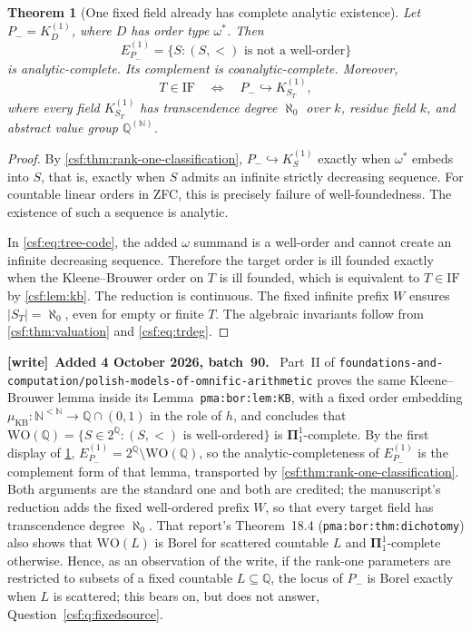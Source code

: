 \documentclass[11pt,a4paper]{article}
\numberwithin{equation}{section}
\newtheorem{theorem}{Theorem}[section]
\theoremstyle{definition}
\theoremstyle{remark}
\newcommand{\N}{\mathbb N}
\newcommand{\Q}{\mathbb Q}
\newcommand{\emb}{\hookrightarrow}
\newcommand{\Kone}{K^{(1)}}
\newcommand{\PiC}{\boldsymbol\Pi^1_1}
\newcommand{\KB}{\mathrm{KB}}
\newcommand{\IF}{\mathrm{IF}}
\newcommand{\repo}[1]{\nolinkurl{#1}}
\newcommand{\lbl}[1]{\nolinkurl{#1}}
\newenvironment{writenote}[1][]{\par\smallskip\begingroup\small\raggedright
 \setlength{\parindent}{1.25em}\noindent\textbf{[write]}\if\relax\detokenize{#1}\relax\else~\textbf{#1.}\fi\ }%
 {\par\endgroup\smallskip}
\begin{document}
\begin{theorem}[One fixed field already has complete analytic existence]
\label{csf:thm:fixed-hard}
Let $P_-=\Kone_D$, where $D$ has order type $\omega^*$. Then
\[
 E^{(1)}_{P_-}=\{S:(S,<)\text{ is not a well-order}\}
\]
is analytic-complete. Its complement is coanalytic-complete. Moreover,
\[
 T\in\IF\quad\Longleftrightarrow\quad P_-\emb\Kone_{S_T},
\]
where every field $\Kone_{S_T}$ has transcendence degree $\aleph_0$ over
$k$, residue field $k$, and abstract value group $\Q^{(\N)}$.
\end{theorem}
\begin{proof}
By \cref{csf:thm:rank-one-classification}, $P_-\emb\Kone_S$ exactly when
$\omega^*$ embeds into $S$, that is, exactly when $S$ admits an infinite
strictly decreasing sequence. For countable linear orders in ZFC, this is
precisely failure of well-foundedness. The existence of such a sequence is
analytic.

In \eqref{csf:eq:tree-code}, the added $\omega$ summand is a well-order and
cannot create an infinite decreasing sequence. Therefore the target order
is ill founded exactly when the Kleene--Brouwer order on $T$ is ill
founded, which is equivalent to $T\in\IF$ by \cref{csf:lem:kb}. The reduction is
continuous. The fixed infinite prefix $W$ ensures $|S_T|=\aleph_0$, even
for empty or finite $T$. The algebraic invariants follow from
\cref{csf:thm:valuation} and \eqref{csf:eq:trdeg}.
\end{proof}

\begin{writenote}[Added 4 October 2026, batch~90]
Part~II of \repo{foundations-and-computation/polish-models-of-omnific-arithmetic} proves the same Kleene--Brouwer lemma inside its Lemma~\lbl{pma:bor:lem:KB}, with a fixed order embedding $\mu_{\KB}:\N^{<\N}\to\Q\cap(0,1)$ in the role of $h$, and concludes that $\mathrm{WO}(\Q)=\{S\in2^{\Q}:(S,<)\text{ is well-ordered}\}$ is $\PiC$-complete. By the first display of \cref{csf:thm:fixed-hard}, $E^{(1)}_{P_-}=2^{\Q}\setminus\mathrm{WO}(\Q)$, so the analytic-completeness of $E^{(1)}_{P_-}$ is the complement form of that lemma, transported by \cref{csf:thm:rank-one-classification}. Both arguments are the standard one and both are credited; the manuscript's reduction adds the fixed well-ordered prefix $W$, so that every target field has transcendence degree $\aleph_0$. That report's Theorem~18.4 (\lbl{pma:bor:thm:dichotomy}) also shows that $\mathrm{WO}(L)$ is Borel for scattered countable $L$ and $\PiC$-complete otherwise. Hence, as an observation of the write, if the rank-one parameters are restricted to subsets of a fixed countable $L\subseteq\Q$, the locus of $P_-$ is Borel exactly when $L$ is scattered; this bears on, but does not answer, Question~\ref{csf:q:fixedsource}.
\end{writenote}
\end{document}
